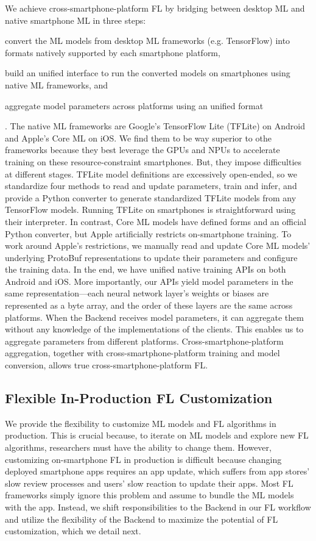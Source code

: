 \documentclass[letterpaper]{article} %
\begin{document}
We achieve cross-smartphone-platform FL by bridging between
desktop ML and native smartphone ML in three steps:
\begin{enumerate*}[label=\arabic*.]
    \item convert the ML models from desktop ML frameworks (e.g. TensorFlow)
        into formats natively supported by each smartphone platform,
    \item build an unified interface to run the converted models on smartphones
        using native ML frameworks, and
    \item aggregate model parameters across platforms using an unified format
\end{enumerate*}.
The native ML frameworks are Google's TensorFlow Lite (TFLite) on Android and
Apple's Core ML on iOS.
We find them to be way superior to othe frameworks because
they best leverage the GPUs and NPUs to accelerate training on
these resource-constraint smartphones.
But, they impose difficulties at different stages.
TFLite model definitions are excessively open-ended,
so we standardize four methods to read and update parameters,
train and infer, and
provide a Python converter to generate standardized TFLite models from
any TensorFlow models.
Running TFLite on smartphones is straightforward using their interpreter.
In contrast, Core ML models have defined forms and an official Python converter,
but Apple artificially restricts on-smartphone training.
To work around Apple's restrictions,
we manually read and update Core ML models' underlying ProtoBuf representations
to update their parameters and configure the training data.
In the end, we have unified native training APIs on both Android and iOS.
More importantly, our APIs yield model parameters in the same
representation---each neural network layer's weights or biases are represented
as a byte array, and
the order of these layers are the same across platforms.
When the Backend receives model parameters,
it can aggregate them without any knowledge of
the implementations of the clients.
This enables us to aggregate parameters from different platforms.
Cross-smartphone-platform aggregation,
together with cross-smartphone-platform training and model conversion,
allows true cross-smartphone-platform FL.

\subsection{Flexible In-Production FL Customization}
\newcommand{\model}{$M$}
\newcommand{\fs}{$S_\mathrm F$}
We provide the flexibility to customize ML models and FL algorithms
in production.
This is crucial because, to iterate on ML models and explore new FL algorithms,
researchers must have the ability to change them.
However, customizing on-smartphone FL in production is difficult because
changing deployed smartphone apps requires an app update,
which suffers from app stores' slow review processes and
users' slow reaction to update their apps.
Most FL frameworks simply ignore this problem and assume to
bundle the ML models with the app.
Instead, we shift responsibilities to the Backend in our FL workflow and
utilize the flexibility of the Backend to
maximize the potential of FL customization,
which we detail next.
\end{document}
